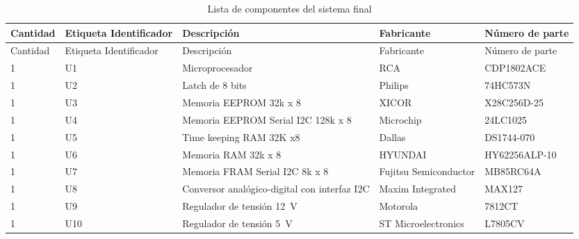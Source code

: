 \footnotesize
\begin{longtable}{|p{}|p{}|p{}|p{}|p{}|}
\caption{Lista de componentes del sistema final} %
\label{T:bom_sis_final}
\\
\hline
Cantidad & Etiqueta \newline
           Identificador            & Descripción                               & Fabricante            & Número de parte       \\ \hline \hline \endfirsthead
\hline
Cantidad & Etiqueta \newline
           Identificador            & Descripción                               & Fabricante            & Número de parte       \\ \hline \hline \endhead
1       & U1                        & Microprocesador                           & RCA                   & CDP1802ACE            \\ \hline
1       & U2                        & Latch de 8 bits                           & Philips               & 74HC573N              \\ \hline
1       & U3                        & Memoria EEPROM 32k x 8                    & XICOR                 & X28C256D-25           \\ \hline
1       & U4                        & Memoria EEPROM Serial I2C 128k x 8        & Microchip             & 24LC1025              \\ \hline
1       & U5                        & Time keeping RAM 32K x8                   & Dallas                & DS1744-070            \\ \hline
1       & U6                        & Memoria RAM 32k x 8                       & HYUNDAI               & HY62256ALP-10         \\ \hline
1       & U7                        & Memoria FRAM Serial I2C 8k x 8            & Fujitsu Semiconductor & MB85RC64A            \\ \hline
1       & U8                        & Conversor analógico-digital con interfaz I2C & Maxim Integrated   & MAX127                \\ \hline
1       & U9                        & Regulador de tensión 12~\si{\volt}        & Motorola              & 7812CT                \\ \hline
1       & U10                       & Regulador de tensión 5~\si{\volt}         & ST Microelectronics   & L7805CV               \\ \hline

\end{longtable}
